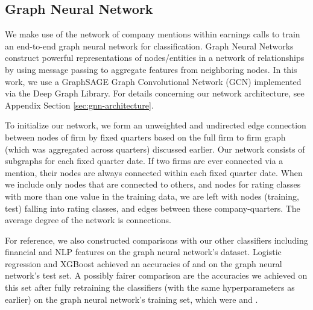 \documentclass{article}[11pt]
\begin{document}
    \subsection*{Graph Neural Network}

    We make use of the network of company mentions within earnings calls to train an end-to-end graph neural network for classification. Graph Neural Networks construct powerful representations of nodes/entities in a network of relationships by using message passing to aggregate features from neighboring nodes. In this work, we use a GraphSAGE \citep{hamilton_inductive_2018} Graph Convolutional Network (GCN) implemented via the Deep Graph Library. \citep{deep_graph_library_deep_2024} For details concerning our network architecture, see Appendix Section \ref{sec:gnn-architecture}.


    To initialize our network, we form an unweighted and undirected edge connection between nodes of firm by fixed quarters based on the full firm to firm graph (which was aggregated across quarters) discussed earlier. Our network consists of subgraphs for each fixed quarter date. If two firms are ever connected via a mention, their nodes are always connected within each fixed quarter date. When we include only nodes that are connected to others, and nodes for rating classes with more than one value in the training data, we are left with \numNodes \space nodes (\numTrainNodes \space training, \numTestNodes \space test) falling into \gnnNumClasses \space rating classes, and \numEdges \space edges between these company-quarters. The average degree of the network is \averageDegree \space connections.

    For reference, we also constructed comparisons with our other classifiers including financial and NLP features on the graph neural network's dataset. Logistic regression and XGBoost achieved an accuracies of \pretrainedLRAccuracy \space and \pretrainedXGBAccuracy \space on the graph neural network's test set. A possibly fairer comparison are the accuracies we achieved on this set after fully retraining the classifiers (with the same hyperparameters as earlier) on the graph neural network's training set, which were \retrainLRAccuracy \space and \retrainXGBAccuracy.
\end{document}
